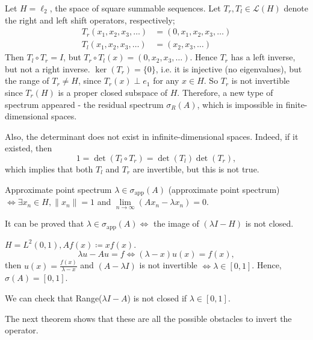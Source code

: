 \documentclass{report}
\begin{document}
\begin{example}{}{}
    Let \(H = \ell_{2}\), the space of square summable sequences. Let \(T_{r}, T_{l} \in \mathcal{L}(H)\) denote the right and left shift operators, respectively;
    \begin{align*}
        T_{r}(x_1, x_2, x_3, \dots) &= (0, x_1, x_2, x_3, \dots) \\
        T_{l}(x_1, x_2, x_3, \dots) &= (x_2, x_3, \dots)
    \end{align*}
    Then \(T_{l} \circ T_{r} = I\), but \(T_{r} \circ T_{l} (x) = (0, x_2, x_3, \dots)\). Hence \(T_{r}\) has a left inverse, but not a right inverse. \(\ker(T_{r}) = \{0\}\), i.e. it is injective (no eigenvalues), but the range of \(T_{r} \neq H\), since \(T_{r}(x) \perp e_{1}\) for any \(x \in H\). So \(T_{r}\) is not invertible since \(T_{r}(H)\) is a proper closed subspace of \(H\). Therefore, a new type of spectrum appeared - the residual spectrum \(\sigma_{R}(A)\), which is impossible in finite-dimensional spaces. 

    Also, the determinant does not exist in infinite-dimensional spaces. Indeed, if it existed, then
    \[
        1 = \det(T_{l} \circ T_{r}) = \det(T_{l})\det(T_{r}),
    \]
    which implies that both \(T_{l}\) and \(T_{r}\) are invertible, but this is not true.
\end{example}

\begin{definition}{Approximate point spectrum}{}
    \(\lambda \in \sigma_{\text{app}}(A)\) (approximate point spectrum) \(\iff \exists x_{n} \in H, \|x_{n}\| = 1\) and \(\lim\limits_{n \rightarrow \infty} (Ax_{n}-\lambda x_{n}) = 0\).

    It can be proved that \(\lambda \in \sigma_{\text{app}}(A) \iff \) the image of \((\lambda I - H)\) is not closed.
\end{definition}

\begin{example}{}{}
    \(H = L^{2}(0, 1), Af(x) \coloneqq xf(x)\).
    \[
        \lambda u - Au = f \iff (\lambda - x)u(x) = f(x),
    \]
    then \(u(x) = \frac{f(x)}{\lambda - x}\) and \((A - \lambda I)\) is not invertible \(\iff \lambda \in [0, 1]\). Hence, \(\sigma(A) = [0, 1]\).

    We can check that Range(\(\lambda I - A\)) is not closed if \(\lambda \in [0, 1]\).
\end{example}
The next theorem shows that these are all the possible obstacles to invert the operator.
\end{document}

